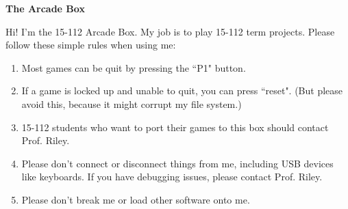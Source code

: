 \documentclass[a4paper,landscape,12pt]{article}
\begin{document}
\thispagestyle{empty}
\begin{center}
{\Huge \textbf{The Arcade Box}}
\end{center}

\huge

Hi!  I'm the 15-112 Arcade Box.  My job is to play 15-112 term projects.  Please follow these simple rules when using me:

\begin{enumerate}
\item Most games can be quit by pressing the ``P1" button.
\item If a game is locked up and unable to quit, you can press ``reset".  (But please avoid this, because it might corrupt my file system.)
\item 15-112 students who want to port their games to this box should contact Prof. Riley.
\item Please don't connect or disconnect things from me, including USB devices like keyboards.  If you have debugging issues, please contact Prof. Riley.
\item Please don't break me or load other software onto me.

\end{enumerate}
\end{document}
